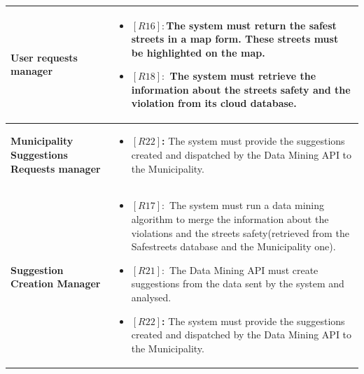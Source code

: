 \documentclass[titlepage]{article}
\begin{document}
\begin{longtable}{| p{4 cm} | p{11.5 cm} |}
		\newline \textbf {User requests manager} &
		\begin{itemize}
			\item \textbf{$[R16]:$}The system must return the safest streets in a map form. These streets must be highlighted on the map.
			\item \textbf{$[R18]:$} The system must retrieve the information about the streets
safety and the violation from its cloud database.
		\end{itemize} \\ \hline
		\newline \textbf {Municipality Suggestions Requests manager} &
		\begin{itemize}
			\item \textbf{$[R22]$:} The system must provide the suggestions created and dispatched
by the Data Mining API to the Municipality.
		\end{itemize} \\ \hline
		\newline \textbf {Suggestion Creation Manager} &
		\begin{itemize}
			\item \textbf{$[R17]:$} The system must run a data mining algorithm to merge the information about the violations and the streets safety(retrieved from the Safestreets database and the Municipality one).
			 \item \textbf{$[R21]:$} The Data Mining API must create suggestions from the data sent by the system and analysed.
			 \item \textbf{$[R22]$:} The system must provide the suggestions created and dispatched
by the Data Mining API to the Municipality.
			 

\end{itemize}
\end{longtable}
\end{document}

